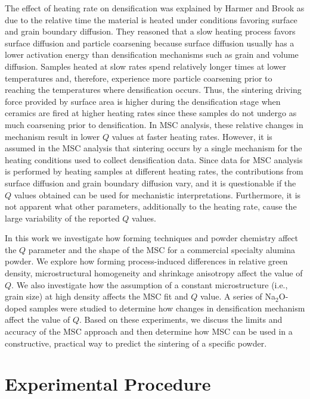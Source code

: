 The effect of heating rate on densification was explained by Harmer and Brook \cite{Harmer1981} as due to the relative time the material is heated under conditions favoring surface and grain boundary diffusion. They reasoned that a slow heating process favors surface diffusion and particle coarsening because surface diffusion usually has a lower activation energy than densification mechanisms such as grain and volume diffusion. Samples heated at slow rates spend relatively longer times at lower temperatures and, therefore, experience more particle coarsening prior to reaching the temperatures where densification occurs. Thus, the sintering driving force provided by surface area is higher during the densification stage when ceramics are fired at higher heating rates since these samples do not undergo as much coarsening prior to densification. In MSC analysis, these relative changes in mechanism result in lower $Q$ values at faster heating rates. However, it is assumed in the MSC analysis that sintering occurs by a single mechanism for the heating conditions used to collect densification data. Since data for MSC analysis is performed by heating samples at different heating rates, the contributions from surface diffusion and grain boundary diffusion vary, and it is questionable if the $Q$ values obtained can be used for mechanistic interpretations. Furthermore, it is not apparent what other parameters, additionally to the heating rate, cause the large variability of the reported $Q$ values.  

In this work we investigate how forming techniques and powder chemistry affect the $Q$ parameter and the shape of the MSC for a commercial specialty alumina powder. We explore how forming process-induced differences in relative green density, microstructural homogeneity and shrinkage anisotropy affect the value of $Q$. We also investigate how the assumption of a constant microstructure (i.e., grain size) at high density affects the MSC fit and $Q$ value. A series of Na$_{2}$O-doped samples were studied to determine how changes in densification mechanism affect the value of $Q$.  Based on these experiments, we discuss the limits and accuracy of the MSC approach and then determine how MSC can be used in a constructive, practical way to predict the sintering of a specific powder.

\section{Experimental Procedure}

